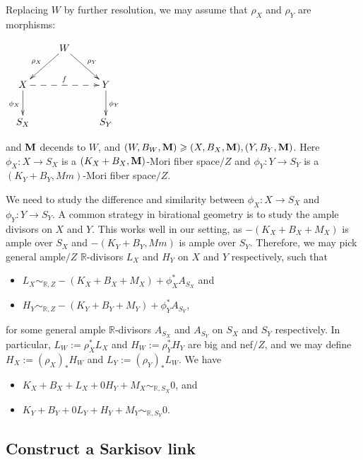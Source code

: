 \documentclass[11pt]{amsart}
\numberwithin{equation}{section}
\newcommand{\Mm}{{\bf{M}}}
\newcommand{\Rr}{\mathbb{R}}
\theoremstyle{definition}
\theoremstyle{definition}
\theoremstyle{definition}
\begin{document}
Replacing $W$ by further resolution,  we may assume that $\rho_X$ and $\rho_Y$ are morphisms:
\begin{center}$\xymatrix{
 & W\ar@{->}[dl]_{\rho_X}\ar@{->}[dr]^{\rho_Y}& \\
      X \ar@{->}[d]_{\phi_X}\ar@{-->}[rr]^{f}   &  & Y\ar@{->}[d]^{\phi_Y} \\
    S_X & &S_Y }$
\end{center}
and $\Mm$ decends to $W$, and  $(W,B_{W},\Mm) \geqslant (X,B_{X},\Mm), (Y,B_{Y},\Mm)$.
Here $\phi_X: X\rightarrow S_X$ is a $(K_X+B_X,\Mm)$-Mori fiber space$/Z$ and $\phi_Y: Y\rightarrow S_Y$ is a $(K_Y+B_Y,Mm)$-Mori fiber space$/Z$. 

We need to study the difference and similarity between $\phi_X: X\rightarrow S_X$ and $\phi_Y: Y\rightarrow S_Y$. A common strategy in birational geometry is to study the ample divisors on $X$ and $Y$. This works well in our setting, as $-(K_X+B_X+M_X)$ is ample over $S_X$ and  $-(K_Y+B_Y,Mm)$ is ample over $S_Y$. Therefore, we may pick general ample$/Z$ $\Rr$-divisors $L_X$ and $H_Y$ on $X$ and $Y$ respectively, such that
\begin{itemize}
    \item $L_X\sim_{\Rr,Z}-(K_X+B_X+M_X)+\phi_X^*A_{S_X}$ and
    \item $H_Y\sim_{\Rr,Z}-(K_Y+B_Y+M_Y)+\phi_Y^*A_{S_Y}$, 
\end{itemize}
for some general ample $\Rr$-divisors $A_{S_X}$ and $A_{S_Y}$ on $S_X$ and $S_Y$ respectively. In particular, $L_W:=\rho_X^*L_X$ and $H_W:=\rho_Y^*H_Y$ are big and nef$/Z$, and we may define $H_X:=(\rho_X)_*H_W$ and $L_Y:=(\rho_Y)_*L_W$. We have
\begin{itemize}
    \item $K_X+B_X+L_X+0H_Y+M_X\sim_{\mathbb R,S_X}0$, and
    \item $K_Y+B_Y+0L_Y+H_Y+M_Y\sim_{\mathbb R,S_Y}0$.

\end{itemize}

\subsection{Construct a Sarkisov link}
\end{document}
